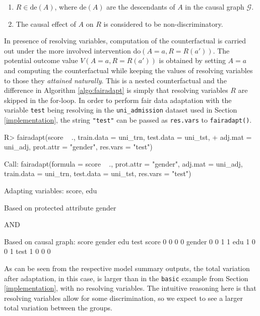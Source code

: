 \documentclass[
  nojss]{jss}
\providecommand{\tightlist}{%
  \setlength{\itemsep}{0pt}\setlength{\parskip}{0pt}}
\begin{document}
\begin{enumerate}
\def\labelenumi{(\roman{enumi})}
\tightlist
\item
  \(R \in \mathrm{de}(A)\), where \(\mathrm{de}(A)\) are the descendants
  of \(A\) in the causal graph \(\mathcal{G}\).
\item
  The causal effect of \(A\) on \(R\) is considered to be
  non-discriminatory.
\end{enumerate}

In presence of resolving variables, computation of the counterfactual is
carried out under the more involved intervention
do\((A = a, R = R(a'))\). The potential outcome value
\(V(A = a, R = R(a'))\) is obtained by setting \(A = a\) and computing
the counterfactual while keeping the values of resolving variables to
those they \emph{attained naturally}. This is a nested counterfactual
and the difference in Algorithm \ref{algo:fairadapt} is simply that
resolving variables \(R\) are skipped in the for-loop. In order to
perform fair data adaptation with the variable \texttt{test} being
resolving in the \texttt{uni\_admission} dataset used in Section
\ref{implementation}, the string \texttt{"test"} can be passed as
\texttt{res.vars} to \texttt{fairadapt()}.

\begin{CodeChunk}
\begin{CodeInput}
R> fairadapt(score ~ ., train.data = uni_trn, test.data = uni_tst,
+           adj.mat = uni_adj, prot.attr = "gender", res.vars = "test")
\end{CodeInput}
\begin{CodeOutput}

Call:
fairadapt(formula = score ~ ., prot.attr = "gender", adj.mat = uni_adj, 
    train.data = uni_trn, test.data = uni_tst, res.vars = "test")


Adapting variables:
  score, edu

Based on protected attribute gender 

  AND

Based on causal graph:
       score gender edu test
score      0      0   0    0
gender     0      0   1    1
edu        1      0   0    1
test       1      0   0    0
\end{CodeOutput}
\end{CodeChunk}

As can be seen from the respective model summary outputs, the total
variation after adaptation, in this case, is larger than in the
\texttt{basic} example from Section \ref{implementation}, with no
resolving variables. The intuitive reasoning here is that resolving
variables allow for some discrimination, so we expect to see a larger
total variation between the groups.
\end{document}
